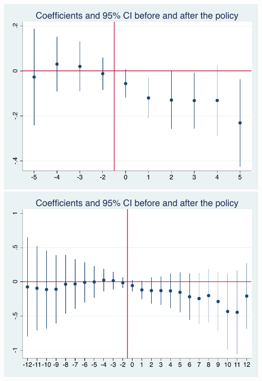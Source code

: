 \documentclass[11pt]{article}
\begin{document}
\begin{enumerate}[1)]
\begin{enumerate}[(a)]
			\includegraphics[scale=.8]{input/coef_plot_5year.pdf} \\
			\includegraphics[scale=.8]{input/coef_plot_12year.pdf}
		

\end{enumerate}
\end{enumerate}
\end{document}
